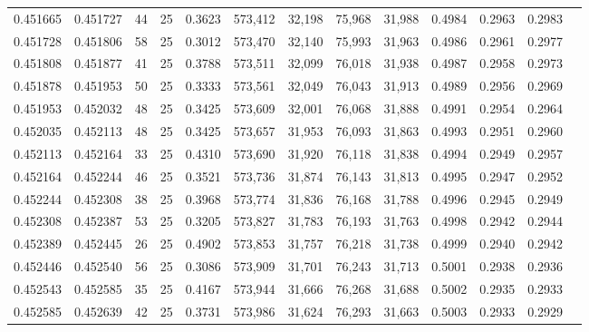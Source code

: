 \begin{tabular}{rrrrrrrrrrrrr}
0.451665 & 0.451727 &    44 &  25 &                                     0.3623 & 573,412 &  32,198 &  75,968 &  31,988 & 0.4984 & 0.2963 & 0.2983 \\
0.451728 & 0.451806 &    58 &  25 &                                     0.3012 & 573,470 &  32,140 &  75,993 &  31,963 & 0.4986 & 0.2961 & 0.2977 \\
0.451808 & 0.451877 &    41 &  25 &                                     0.3788 & 573,511 &  32,099 &  76,018 &  31,938 & 0.4987 & 0.2958 & 0.2973 \\
0.451878 & 0.451953 &    50 &  25 &                                     0.3333 & 573,561 &  32,049 &  76,043 &  31,913 & 0.4989 & 0.2956 & 0.2969 \\
0.451953 & 0.452032 &    48 &  25 &                                     0.3425 & 573,609 &  32,001 &  76,068 &  31,888 & 0.4991 & 0.2954 & 0.2964 \\
0.452035 & 0.452113 &    48 &  25 &                                     0.3425 & 573,657 &  31,953 &  76,093 &  31,863 & 0.4993 & 0.2951 & 0.2960 \\
0.452113 & 0.452164 &    33 &  25 &                                     0.4310 & 573,690 &  31,920 &  76,118 &  31,838 & 0.4994 & 0.2949 & 0.2957 \\
0.452164 & 0.452244 &    46 &  25 &                                     0.3521 & 573,736 &  31,874 &  76,143 &  31,813 & 0.4995 & 0.2947 & 0.2952 \\
0.452244 & 0.452308 &    38 &  25 &                                     0.3968 & 573,774 &  31,836 &  76,168 &  31,788 & 0.4996 & 0.2945 & 0.2949 \\
0.452308 & 0.452387 &    53 &  25 &                                     0.3205 & 573,827 &  31,783 &  76,193 &  31,763 & 0.4998 & 0.2942 & 0.2944 \\
0.452389 & 0.452445 &    26 &  25 &                                     0.4902 & 573,853 &  31,757 &  76,218 &  31,738 & 0.4999 & 0.2940 & 0.2942 \\
0.452446 & 0.452540 &    56 &  25 &                                     0.3086 & 573,909 &  31,701 &  76,243 &  31,713 & 0.5001 & 0.2938 & 0.2936 \\
0.452543 & 0.452585 &    35 &  25 &                                     0.4167 & 573,944 &  31,666 &  76,268 &  31,688 & 0.5002 & 0.2935 & 0.2933 \\
0.452585 & 0.452639 &    42 &  25 &                                     0.3731 & 573,986 &  31,624 &  76,293 &  31,663 & 0.5003 & 0.2933 & 0.2929 \\

\end{tabular}
